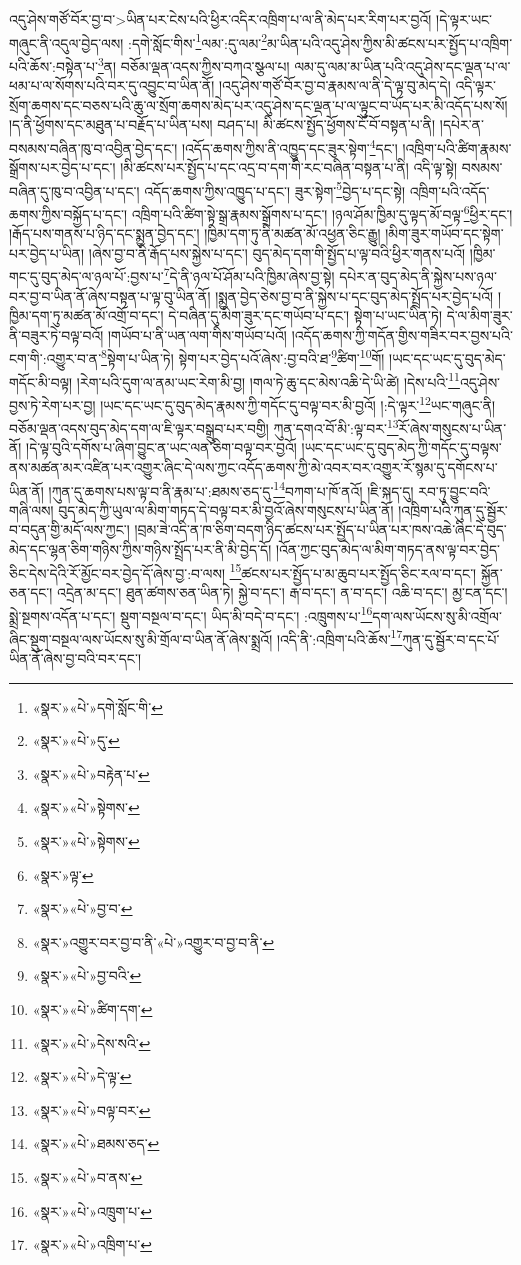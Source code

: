 འདུ་ཤེས་གཙོ་བོར་བྱ་བ་>ཡིན་པར་ངེས་པའི་ཕྱིར་འདིར་འཁྲིག་པ་ལ་ནི་མེད་པར་རིག་པར་བྱའོ། །དེ་ལྟར་ཡང་གཞུང་ནི་འདུལ་བྱེད་ལས། :དགེ་སློང་གིས་\footnote{«སྣར་»«པེ་»དགེ་སློང་གི་}ལམ་:དུ་ལམ་\footnote{«སྣར་»«པེ་»དུ་}མ་ཡིན་པའི་འདུ་ཤེས་ཀྱིས་མི་ཚངས་པར་སྤྱོད་པ་འཁྲིག་པའི་ཆོས་:བསྟེན་པ་\footnote{«སྣར་»«པེ་»བརྟེན་པ་}ན། བཅོམ་ལྡན་འདས་ཀྱིས་བཀའ་སྩལ་པ། ལམ་དུ་ལམ་མ་ཡིན་པའི་འདུ་ཤེས་དང་ལྡན་པ་ལ་ཕམ་པ་ལ་སོགས་པའི་བར་དུ་འབྱུང་བ་ཡིན་ནོ། །འདུ་ཤེས་གཙོ་བོར་བྱ་བ་རྣམས་ལ་ནི་དེ་ལྟ་བུ་མེད་དེ། འདི་ལྟར་སྲོག་ཆགས་དང་བཅས་པའི་ཆུ་ལ་སྲོག་ཆགས་མེད་པར་འདུ་ཤེས་དང་ལྡན་པ་ལ་ལྟུང་བ་ཡོད་པར་མི་འདོད་པས་སོ། །ད་ནི་ཕྱོགས་དང་མཐུན་པ་བརྗོད་པ་ཡིན་པས། བཤད་པ། མི་ཚངས་སྤྱོད་ཕྱོགས་ངོ་བོ་བསྟན་པ་ནི། །དཔེར་ན་བསམས་བཞིན་ཁུ་བ་འབྱིན་བྱེད་དང་། །འདོད་ཆགས་ཀྱིས་ནི་འཁྱུད་དང་ཟུར་སྟེག་\footnote{«སྣར་»«པེ་»སྟེགས་}དང་། །འཁྲིག་པའི་ཚིག་རྣམས་སྒྲོགས་པར་བྱེད་པ་དང་། །མི་ཚངས་པར་སྤྱོད་པ་དང་འདྲ་བ་དག་གི་རང་བཞིན་བསྟན་པ་ནི། འདི་ལྟ་སྟེ། བསམས་བཞིན་དུ་ཁུ་བ་འབྱིན་པ་དང་། འདོད་ཆགས་ཀྱིས་འཁྱུད་པ་དང་། ཟུར་སྟེག་\footnote{«སྣར་»«པེ་»སྟེགས་}བྱེད་པ་དང་སྟེ། འཁྲིག་པའི་འདོད་ཆགས་ཀྱིས་བསྐྱོད་པ་དང་། འཁྲིག་པའི་ཚིག་སྟེ་སྒྲ་རྣམས་སྒྲོགས་པ་དང་། །ཉལ་ཤོམ་ཁྱིམ་དུ་ལྟད་མོ་བལྟ་\footnote{«སྣར་»ལྟ་}ཕྱིར་དང་། །རྒོད་པས་གནས་པ་ཉིད་དང་སྨྱན་བྱེད་དང་། །ཁྱིམ་དག་ཏུ་ནི་མཚན་མོ་འཕྱན་ཅིང་རྒྱུ། །མིག་ཟུར་གཡོབ་དང་སྟེག་པར་བྱེད་པ་ཡིན། །ཞེས་བྱ་བ་ནི་རྒོད་པས་སྐྱེས་པ་དང་། བུད་མེད་དག་གི་སྤྱོད་པ་ལྟ་བའི་ཕྱིར་གནས་པའོ། །ཁྱིམ་གང་དུ་བུད་མེད་ལ་ཉལ་པོ་:བྱས་པ་\footnote{«སྣར་»«པེ་»བྱ་བ་}དེ་ནི་ཉལ་པོ་ཤོམ་པའི་ཁྱིམ་ཞེས་བྱ་སྟེ། དཔེར་ན་བུད་མེད་ནི་སྐྱེས་པས་ཉལ་བར་བྱ་བ་ཡིན་ནོ་ཞེས་བསྟན་པ་ལྟ་བུ་ཡིན་ནོ། །སྨྱན་བྱེད་ཅེས་བྱ་བ་ནི་སྐྱེས་པ་དང་བུད་མེད་སྤྲོད་པར་བྱེད་པའོ། །ཁྱིམ་དག་ཏུ་མཚན་མོ་འགྲོ་བ་དང་། དེ་བཞིན་དུ་མིག་ཟུར་དང་གཡོབ་པ་དང་། སྟེག་པ་ཡང་ཡིན་ཏེ། དེ་ལ་མིག་ཟུར་ནི་བཟུར་ཏེ་བལྟ་བའོ། །གཡོབ་པ་ནི་ཡན་ལག་གིས་གཡོབ་པའོ། །འདོད་ཆགས་ཀྱི་གདོན་གྱིས་གཟིར་བར་བྱས་པའི་ངག་གི་:འགྱུར་བ་ན་\footnote{«སྣར་»འགྱུར་བར་བྱ་བ་ནི་«པེ་»འགྱུར་བ་བྱ་བ་ནི་}སྟེག་པ་ཡིན་ཏེ། སྟེག་པར་བྱེད་པའོ་ཞེས་:བྱ་བའི་ཐ་\footnote{«སྣར་»«པེ་»བྱ་བའི་}ཚིག་\footnote{«སྣར་»«པེ་»ཚིག་དག་}གོ། །ཡང་དང་ཡང་དུ་བུད་མེད་གདོང་མི་བལྟ། །རེག་པའི་དུག་ལ་ནམ་ཡང་རེག་མི་བྱ། །གལ་ཏེ་ཆུ་དང་མེས་འཆི་དེ་ཡི་ཚེ། །དེས་པའི་\footnote{«སྣར་»«པེ་»དེས་སའི་}འདུ་ཤེས་བྱས་ཏེ་རེག་པར་བྱ། །ཡང་དང་ཡང་དུ་བུད་མེད་རྣམས་ཀྱི་གདོང་དུ་བལྟ་བར་མི་བྱའོ། །:དེ་ལྟར་\footnote{«སྣར་»«པེ་»དེ་ལྟ་}ཡང་གཞུང་ནི། བཅོམ་ལྡན་འདས་བུད་མེད་དག་ལ་ཇི་ལྟར་བསྒྲུབ་པར་བགྱི། ཀུན་དགའ་བོ་མི་:ལྟ་བར་\footnote{«སྣར་»«པེ་»བལྟ་བར་}རོ་ཞེས་གསུངས་པ་ཡིན་ནོ། །དེ་ལྟ་བུའི་དགོས་པ་ཞིག་བྱུང་ན་ཡང་ལན་ཅིག་བལྟ་བར་བྱའོ། །ཡང་དང་ཡང་དུ་བུད་མེད་ཀྱི་གདོང་དུ་བལྟས་ནས་མཚན་མར་འཛིན་པར་འགྱུར་ཞིང་དེ་ལས་ཀྱང་འདོད་ཆགས་ཀྱི་མེ་འབར་བར་འགྱུར་རོ་སྙམ་དུ་དགོངས་པ་ཡིན་ནོ། །ཀུན་དུ་ཆགས་པས་ལྟ་བ་ནི་རྣམ་པ་:ཐམས་ཅད་དུ་\footnote{«སྣར་»«པེ་»ཐམས་ཅད་}བཀག་པ་ཁོ་ནའོ། །ཇི་སྐད་དུ། རབ་ཏུ་བྱུང་བའི་གཞི་ལས། བུད་མེད་ཀྱི་ཡུལ་ལ་མིག་གཏད་དེ་བལྟ་བར་མི་བྱའོ་ཞེས་གསུངས་པ་ཡིན་ནོ། །འཁྲིག་པའི་ཀུན་དུ་སྦྱོར་བ་བདུན་གྱི་མདོ་ལས་ཀྱང་། །བྲམ་ཟེ་འདི་ན་ཁ་ཅིག་བདག་ཉིད་ཚངས་པར་སྤྱོད་པ་ཡིན་པར་ཁས་འཆེ་ཞིང་དེ་བུད་མེད་དང་ལྷན་ཅིག་གཉིས་ཀྱིས་གཉིས་སྤྲོད་པར་ནི་མི་བྱེད་དོ། །འོན་ཀྱང་བུད་མེད་ལ་མིག་གཏད་ནས་ལྟ་བར་བྱེད་ཅིང་དེས་དེའི་རོ་མྱོང་བར་བྱེད་དོ་ཞེས་བྱ་:བ་ལས། \footnote{«སྣར་»«པེ་»བ་ནས་}ཚངས་པར་སྤྱོད་པ་མ་ཆུབ་པར་སྤྱོད་ཅིང་རལ་བ་དང་། སྐྱོན་ཅན་དང་། འདྲེན་མ་དང་། ཐུན་ཚགས་ཅན་ཡིན་ཏེ། སྐྱེ་བ་དང་། རྒ་བ་དང་། ན་བ་དང་། འཆི་བ་དང་། མྱ་ངན་དང་། སྨྲེ་སྔགས་འདོན་པ་དང་། སྡུག་བསྔལ་བ་དང་། ཡིད་མི་བདེ་བ་དང་། :འཁྲུགས་པ་\footnote{«སྣར་»«པེ་»འཁྲུག་པ་}དག་ལས་ཡོངས་སུ་མི་འགྲོལ་ཞིང་སྡུག་བསྔལ་ལས་ཡོངས་སུ་མི་གྲོལ་བ་ཡིན་ནོ་ཞེས་སྨྲའོ། །འདི་ནི་:འཁྲིག་པའི་ཆོས་\footnote{«སྣར་»«པེ་»འཁྲིག་པ་}ཀུན་དུ་སྦྱོར་བ་དང་པོ་ཡིན་ནོ་ཞེས་བྱ་བའི་བར་དང་། 